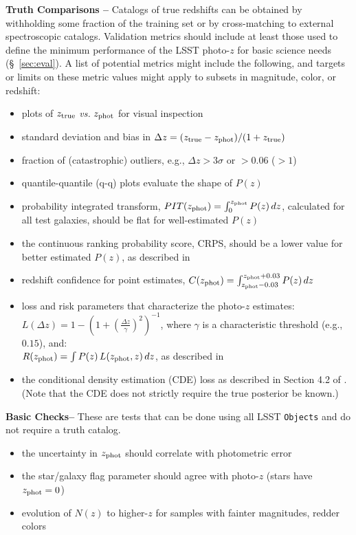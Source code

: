 \documentclass[DM,authoryear,toc]{lsstdoc}
\begin{document}
{\bf Truth Comparisons --} 
Catalogs of true redshifts can be obtained by withholding some fraction of the training set or by cross-matching to external spectroscopic catalogs. Validation metrics should include at least those used to define the minimum performance of the LSST photo-$z$ for basic science needs (\S~\ref{sec:eval}). A list of potential metrics might include the following, and targets or limits on these metric values might apply to subsets in magnitude, color, or redshift: 
\vspace{-15pt}
\begin{itemize}
\item plots of $z_{\rm true}$ {\it vs.} $z_{\rm phot}$ for visual inspection
\item standard deviation and bias in $\Delta z = (z_{\rm true}-z_{\rm phot})/(1+z_{\rm true})$
\item fraction of (catastrophic) outliers, e.g., $\Delta z > 3\sigma$ or $>0.06$ ($>1$)
\item quantile-quantile (q-q) plots evaluate the shape of $P(z)$
\item probability integrated transform, $PIT(z_{\rm phot}) = \int_{0}^{z_{\rm phot}} P(z)\,dz$, calculated for all test galaxies, should be flat for well-estimated $P(z)$ \citep{2016arXiv160808016P}
\item the continuous ranking probability score, CRPS, should be a lower value for better estimated $P(z)$, as described in \citep{2016arXiv160808016P}
\item redshift confidence for point estimates, $C(z_{\rm phot}) = \int_{z_{\rm phot}-0.03}^{z_{\rm phot}+0.03} P(z)\,dz $
\item loss and risk parameters that characterize the photo-$z$ estimates:\\
$L(\Delta z) = 1 - \left(1+ \left(\frac{\Delta z}{\gamma} \right)^2 \right)^{-1}$, 
where $\gamma$ is a characteristic threshold (e.g., $0.15$), and:\\
$R(z_{\rm phot}) = \int P(z)\,L(z_{\rm phot},z)\,dz$, as described in \citet{2018PASJ...70S...9T}
\item the conditional density estimation (CDE) loss as described in Section 4.2 of \citet{2020MNRAS.499.1587S}. (Note that the CDE does not strictly require the true posterior be known.)
\end{itemize}

{\bf Basic Checks--} 
These are tests that can be done using all LSST {\tt Objects} and do not require a truth catalog.
\vspace{-15pt}
\begin{itemize}
\item the uncertainty in $z_{\rm phot}$ should correlate with photometric error
\item the star/galaxy flag parameter should agree with photo-$z$ (stars have $z_{\rm phot}=0$)
\item evolution of $N(z)$ to higher-$z$ for samples with fainter magnitudes, redder colors
\end{itemize}
\end{document}
